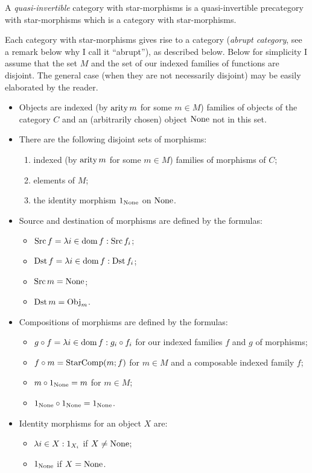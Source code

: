 \begin{defn}
A \emph{quasi-invertible}
category with star-morphisms is a quasi-invertible precategory with
star-morphisms which is a category with star-morphisms.
\end{defn}
Each category with star-morphisms gives rise
to a category (\emph{abrupt category}, see a remark below why I call
it ``abrupt''), as described below. Below for simplicity I assume
that the set $M$ and the set of our indexed families of functions
are disjoint. The general case (when they are not necessarily disjoint)
may be easily elaborated by the reader.
\begin{itemize}
\item Objects are indexed (by $\operatorname{arity} m$ for some $m\in M$) families of
objects of the category $C$ and an (arbitrarily chosen) object $\operatorname{None}$
not in this set.
\item There are the following disjoint sets of morphisms:

\begin{enumerate}
\item indexed (by $\operatorname{arity} m$ for some $m\in M$) families of morphisms
of $C$;
\item elements of $M$;
\item the identity morphism $1_{\operatorname{None}}$ on $\operatorname{None}$.
\end{enumerate}
\item Source and destination of morphisms are defined by the formulas:

\begin{itemize}
\item $\operatorname{Src} f=\lambda i\in\operatorname{dom} f:\operatorname{Src} f_{i}$;
\item $\operatorname{Dst} f=\lambda i\in\operatorname{dom} f:\operatorname{Dst} f_{i}$;
\item $\operatorname{Src} m=\operatorname{None}$;
\item $\operatorname{Dst} m=\operatorname{Obj}_{m}$.
\end{itemize}
\item Compositions of morphisms are defined by the formulas:

\begin{itemize}
\item $g\circ f=\lambda i\in\operatorname{dom} f:g_{i}\circ f_{i}$ for our indexed
families $f$ and $g$ of morphisms;
\item $f\circ m=\operatorname{StarComp}(m;f)$ for $m\in M$ and a composable indexed
family $f$;
\item $m\circ1_{\operatorname{None}}=m$ for $m\in M$;
\item $1_{\operatorname{None}}\circ1_{\operatorname{None}}=1_{\operatorname{None}}$.
\end{itemize}
\item Identity morphisms for an object $X$ are:

\begin{itemize}
\item $\lambda i\in X:1_{X_{i}}$ if $X\ne\operatorname{None}$;
\item $1_{\operatorname{None}}$ if $X=\operatorname{None}$.
\end{itemize}
\end{itemize}
